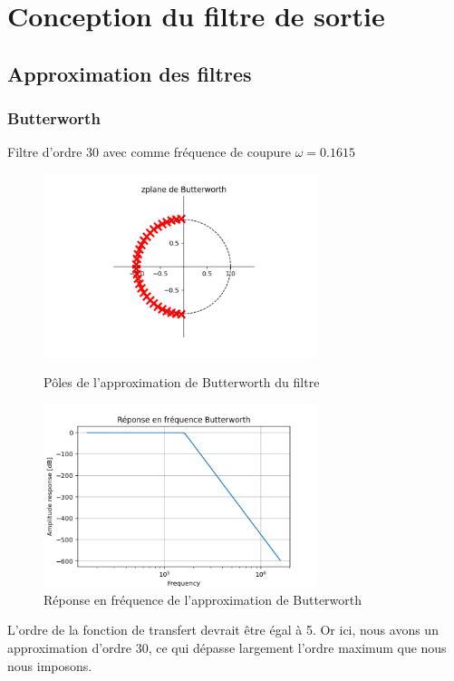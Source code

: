 \documentclass[a4paper,12pt,oneside]{report}	%
\begin{document}
\chapter{Conception du filtre de sortie}
    \section{Approximation des filtres}
\newpage
        \subsection{Butterworth}
            Filtre d'ordre 30 avec comme fréquence de coupure $\omega = 0.1615$
            \begin{figure}[h!]
                \centering
                \includegraphics[width = 8cm]{code-projet-python/2.0.0 - zplane de Butterworth.png}
                \caption{Pôles de l'approximation de Butterworth du filtre}
                \label{fig:zplane-Butterworth}
                \includegraphics[width = 8cm]{code-projet-python/2.0.0 - Réponse en fréquence Butterworth.png}
                \caption{Réponse en fréquence de l'approximation de Butterworth}
                \label{fig:repfreq-Butterworth}
            \end{figure}
            
            L'ordre de la fonction de transfert devrait être égal à 5. Or ici, nous avons un approximation d'ordre 30, ce qui dépasse largement l'ordre maximum que nous nous imposons.
\newpage
\end{document}
